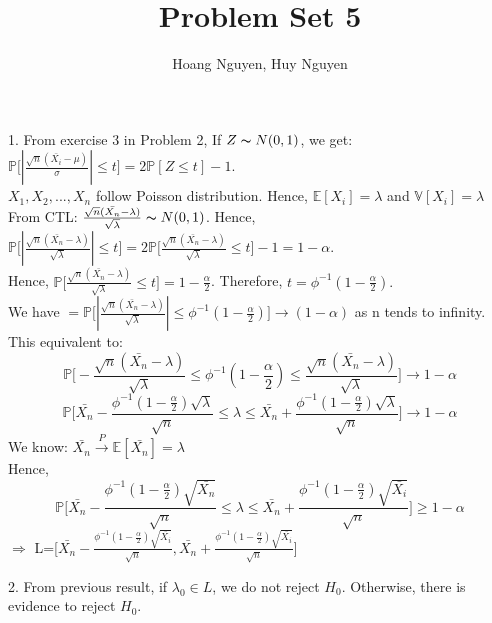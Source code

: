 \documentclass[10pt]{article}
\newenvironment{problem}[2][Problem]{\begin{trivlist}
\item[\hskip \labelsep {\bfseries #1}\hskip \labelsep {\bfseries #2.}]}{\end{trivlist}}
\begin{document}
\title{Problem Set 5}
\author{Hoang Nguyen, Huy Nguyen}
\maketitle
    
\begin{problem}{1}
\item 1.
From exercise 3 in Problem 2, If $Z \thicksim N(0,1)$, we get: $\mathbb{P}\Big[|\frac{\sqrt{n}(\bar{X_i}-\mu)}{\sigma}| \leqslant t\Big]=2\mathbb{P}[Z \leqslant t]-1$.\\
$X_1, X_2,...,X_n$ follow Poisson distribution. Hence, $\mathbb{E}[X_i]=\lambda$ and $\mathbb{V}[X_i]=\lambda$\\
From CTL: $\frac{\sqrt{n}(\bar{X_n}-\lambda)}{\sqrt{\lambda}} \thicksim N(0,1)$. Hence, $\mathbb{P}\Big [ |\frac{\sqrt{n}(\bar{X_n}-\lambda)}{\sqrt{\lambda}}| \leqslant t \Big]=2\mathbb{P}\Big [ \frac{\sqrt{n}(\bar{X_n}-\lambda)}{\sqrt{\lambda}} \leqslant t \Big ]-1=1-\alpha.$\\
Hence, $\mathbb{P}\Big [ \frac{\sqrt{n}(\bar{X_n}-\lambda)}{\sqrt{\lambda}} \leqslant t \Big ]=1- \frac{\alpha}{2}$. Therefore, $t=\phi^{-1}(1- \frac{\alpha}{2}).$\\
We have $ = \mathbb{P}\Big [ |\frac{\sqrt{n}(\bar{X_n}-\lambda)}{\sqrt{\lambda}}| \leqslant \phi^{-1}(1- \frac{\alpha}{2}) \Big ]\rightarrow (1-\alpha)$ as n tends to infinity. This equivalent to:
\[  \mathbb{P}\Big[-\frac{\sqrt{n}(\bar{X_n}-\lambda)}{\sqrt{\lambda}} \leqslant \phi^{-1}(1- \frac{\alpha}{2}) \leqslant \frac{\sqrt{n}(\bar{X_n}-\lambda)}{\sqrt{\lambda}}\Big] \rightarrow 1-\alpha\] 
\[ \mathbb{P}\Big[\bar{X_n}- \frac{\phi^{-1}(1- \frac{\alpha}{2})\sqrt{\lambda}}{\sqrt{n}} \leqslant \lambda \leqslant \bar{X_n}+ \frac{\phi^{-1}(1- \frac{\alpha}{2})\sqrt{\lambda}}{\sqrt{n}}  \Big] \rightarrow 1- \alpha\]
We know: $\bar{X_n} \xrightarrow{P} \mathbb{E}[\bar{X_n}]=\lambda$\\
Hence, 
\[ \mathbb{P}\Big[\bar{X_n}- \frac{\phi^{-1}(1- \frac{\alpha}{2})\sqrt{\bar{X_n}}}{\sqrt{n}} \leqslant \lambda \leqslant \bar{X_n}+ \frac{\phi^{-1}(1- \frac{\alpha}{2})\sqrt{\bar{X_i}}}{\sqrt{n}}  \Big] \geqslant 1- \alpha\]
$\Rightarrow$ L=[$\bar{X_n}- \frac{\phi^{-1}(1- \frac{\alpha}{2})\sqrt{\bar{X_i}}}{\sqrt{n}}, \bar{X_n}+ \frac{\phi^{-1}(1- \frac{\alpha}{2})\sqrt{\bar{X_i}}}{\sqrt{n}}$]


\item 2. 
From previous result, if $\lambda_0 \in L$, we do not reject $H_0$. Otherwise, there is evidence to reject $H_0$.












\end{problem}
\end{document}
